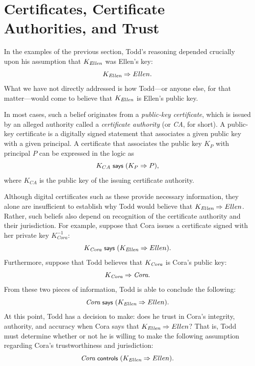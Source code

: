 \section{Certificates,  Certificate Authorities, and Trust}

In the examples of the previous section, Todd's reasoning depended
crucially upon his assumption that $K_{\textit{Ellen}}$ was Ellen's key:
\[K_{\textit{Ellen}} \Rightarrow Ellen. \]
What we have not directly addressed is how Todd---or anyone else, for that
matter---would come to believe 
that $K_{\textit{Ellen}}$ is Ellen's public key.  

In most cases, such a belief originates from a \emph{public-key certificate}, which is issued by an
alleged authority called a \emph{certificate authority} (or \emph{CA}, for short).  A
public-key certificate is a digitally signed statement that associates
a given public key with a given principal.  A certificate that associates the
public key $K_P$ with principal $P$ can be expressed in the logic as
\[ K_{CA} \text{\small\textsf{ says }} (K_P \Rightarrow P), \] where $K_{CA}$ is the public key
of the issuing certificate authority.  

Although digital certificates such as these provide necessary
information, they alone are insufficient to establish why Todd would
believe that $K_{\textit{Ellen}} \Rightarrow Ellen$.  Rather, such beliefs
also depend on recognition of the certificate authority and their
jurisdiction.  For example, 
suppose that Cora issues a
certificate signed with her private key $K^{-1}_{Cora}$:
\[K_{\textit{Cora}} \text{\small\textsf{ says }} (K_{\textit{Ellen}} \Rightarrow Ellen). \]
Furthermore, suppose that Todd believes that $K_{\textit{Cora}}$ is
Cora's public key:
\[K_{\textit{Cora}} \Rightarrow \textit{Cora}. \]
From these two pieces of information, Todd is able to conclude the
following:
\[ \textit{Cora} \text{\small\textsf{ says }} (K_{\textit{Ellen}} \Rightarrow Ellen). \] At this
point, Todd has a decision to make: does he trust in Cora's integrity,
authority, and accuracy when Cora says that $K_{\textit{Ellen}}
\Rightarrow Ellen$?  That is, Todd must determine whether or not he is
willing to make the following assumption regarding Cora's
trustworthiness and jurisdiction:
\[ \textit{Cora} \text{\small\textsf{ controls }} (K_{\textit{Ellen}} \Rightarrow Ellen). \]



